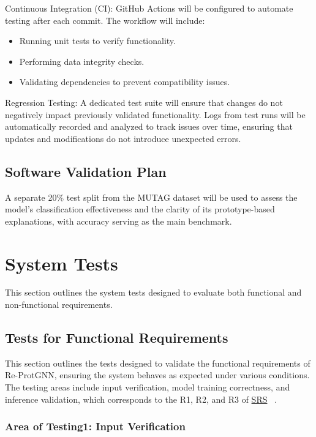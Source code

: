 \documentclass[12pt, titlepage]{article}
\begin{document}
Continuous Integration (CI):
GitHub Actions will be configured to automate testing after each commit. The workflow will include:
\begin{itemize}
    \item Running unit tests to verify functionality.
    \item Performing data integrity checks.
    \item Validating dependencies to prevent compatibility issues.
\end{itemize}

Regression Testing:
A dedicated test suite will ensure that changes do not negatively impact previously validated functionality. Logs from test runs will be automatically recorded and analyzed to track issues over time, ensuring that updates and modifications do not introduce unexpected errors.



\subsection{Software Validation Plan}
\label{sec:svp}
A separate 20\% test split from the MUTAG dataset will be used to assess the model’s classification effectiveness and the clarity of its prototype-based explanations, with accuracy serving as the main benchmark.

\section{System Tests}
\label{sec:system-tests}
This section outlines the system tests designed to evaluate both functional and non-functional requirements.

\subsection{Tests for Functional Requirements}
\label{sub:FR}
This section outlines the tests designed to validate the functional requirements of Re-ProtGNN, ensuring the system behaves as expected under various conditions. The testing areas include input verification, model training correctness, and inference validation, which corresponds to the R1, R2, and R3 of \href{https://github.com/Yuanqi-X/Re-ProtGNN/blob/main/docs/SRS/SRS.pdf}{SRS} ~\citep{Yuanqi_ReProtGNN_SRS}.

\subsubsection{Area of Testing1: Input Verification}
\end{document}
